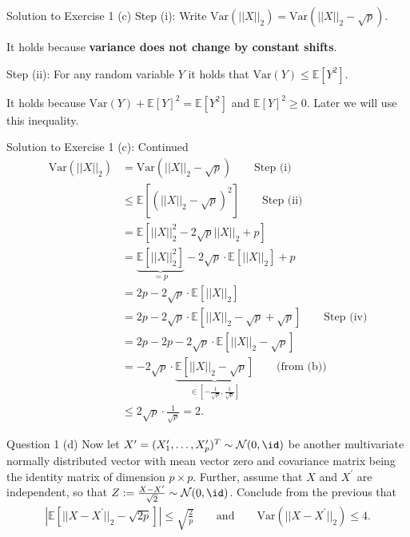 \documentclass[aspectratio=169]{beamer}
\renewcommand{\E}{\mathbb{E}}
\newcommand{\Xnorm}{||X||_2}
\newcommand{\Xnormsq}{||X||_2^2}
\newcommand{\Var}[1]{\mathrm{Var}(#1)}
\newcommand{\Xp}{X^\prime}
\begin{document}
\begin{frame}{Solution to Exercise 1 (c)}
	Step (i): Write $\Var{\Xnorm} = \Var{\Xnorm - \sqrt{p}}$.
	\vspace{20pt}
	
	It holds because \textbf{variance does not change by constant shifts}. 
	\vspace{20pt}
	
	Step (ii): For any random variable $Y$ it holds that $\Var{Y} \leq \E[Y^2] $.
	\vspace{20pt}
	
	It holds because $\Var{Y} + \E[Y]^2 = \E[Y^2]$ and $\E[Y]^2 \geq 0$. Later we will use this inequality.
\end{frame}

\begin{frame}{Solution to Exercise 1 (c): Continued}
	\small
	\begin{align*}
		\Var{\Xnorm} 
		&= \Var{\Xnorm - \sqrt{p}} \qquad \text{Step (i)} \\
		&\leq \E[(\Xnorm - \sqrt{p})^2] \qquad \text{Step (ii)} \\
		&= \E[ \Xnormsq - 2 \sqrt{p} \Xnorm  + p ] \\
		&= \underbrace{\E[\Xnormsq]}_{=p} - 2 \sqrt{p} \cdot \E[\Xnorm] + p \\
		&= 2p  - 2\sqrt{p} \cdot \E[\Xnorm] \\
		&= 2p - 2\sqrt{p}\cdot \E[\Xnorm - \sqrt{p} + \sqrt{p}] \qquad \text{Step (iv)} \\
		&= 2p - 2p - 2\sqrt{p} \cdot \E[\Xnorm - \sqrt{p}] \\
		&= -2\sqrt{p} \cdot \underbrace{\E[\Xnorm - \sqrt{p}]}_{\in \left[-\frac{1}{\sqrt{p}},  \frac{1}{\sqrt{p}}\right]} \qquad \text{(from (b))} \\
		&\leq 2\sqrt{p} \cdot \frac{1}{\sqrt{p}} = 2.
	\end{align*}
\end{frame}

\begin{frame}{Question 1 (d)}
	Now let $\Xp = (X_1^\prime, \ldots, X_p^\prime)^T \sim \mathcal{N}(0, \id)$ be another multivariate normally distributed vector with mean vector zero and covariance matrix being the identity matrix of dimension $p \times p$. Further, assume that $X$ and $X^\prime$ are independent, so that $Z:= \frac{X - \Xp}{\sqrt{2}} \sim \mathcal{N}(0, \id)$. Conclude from the previous that 
	\begin{align*}
		\left| \E \left[|| X - \Xp||_2 - \sqrt{2p} \right] \right| \leq \sqrt{\frac{2}{p}} \qquad \text{and} \qquad \Var{||X - \Xp ||_2} \leq 4.
	\end{align*}
\end{frame}
\end{document}
